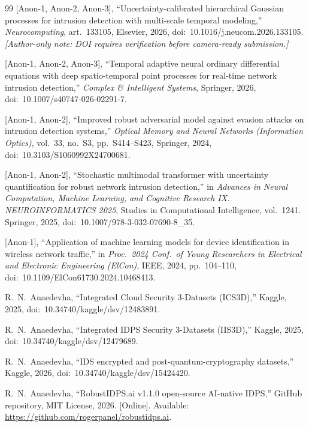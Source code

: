 \documentclass[journal,10pt]{IEEEtran}
\theoremstyle{definition}
\theoremstyle{remark}
\begin{document}
\begin{thebibliography}{99}
 [Anon-1, Anon-2, Anon-3],
``Uncertainty-calibrated hierarchical Gaussian processes for intrusion
detection with multi-scale temporal modeling,''
\emph{Neurocomputing}, art.~133105, Elsevier, 2026,
doi:~10.1016/j.neucom.2026.133105.
\emph{[Author-only note: DOI requires verification before camera-ready submission.]}

 [Anon-1, Anon-2, Anon-3], ``Temporal adaptive
neural ordinary differential equations with deep spatio-temporal point
processes for real-time network intrusion detection,''
\emph{Complex \& Intelligent Systems}, Springer, 2026,
doi:~10.1007/s40747-026-02291-7.

 [Anon-1, Anon-2], ``Improved robust
adversarial model against evasion attacks on intrusion detection
systems,'' \emph{Optical Memory and Neural Networks (Information
Optics)}, vol.~33, no.~S3, pp.~S414--S423, Springer, 2024,
doi:~10.3103/S1060992X24700681.

 [Anon-1, Anon-2], ``Stochastic
multimodal transformer with uncertainty quantification for robust
network intrusion detection,'' in \emph{Advances in Neural Computation,
Machine Learning, and Cognitive Research IX. NEUROINFORMATICS 2025},
Studies in Computational Intelligence, vol.~1241. Springer, 2025,
doi:~10.1007/978-3-032-07690-8\_35.

 [Anon-1], ``Application of machine
learning models for device identification in wireless network
traffic,'' in \emph{Proc.\ 2024 Conf.\ of Young Researchers in
Electrical and Electronic Engineering (ElCon)}, IEEE, 2024,
pp.~104--110, doi:~10.1109/ElCon61730.2024.10468413.

 R.~N.~Anaedevha, ``Integrated Cloud Security
3-Datasets (ICS3D),'' Kaggle, 2025,
doi:~10.34740/kaggle/dsv/12483891.

 R.~N.~Anaedevha, ``Integrated IDPS Security
3-Datasets (IIS3D),'' Kaggle, 2025,
doi:~10.34740/kaggle/dsv/12479689.

 R.~N.~Anaedevha, ``IDS encrypted and
post-quantum-cryptography datasets,'' Kaggle, 2026,
doi:~10.34740/kaggle/dsv/15424420.

 R.~N.~Anaedevha,
``RobustIDPS.ai v1.1.0 open-source AI-native IDPS,''
GitHub repository, MIT License, 2026.
[Online]. Available: \url{https://github.com/rogerpanel/robustidps.ai}.

\end{thebibliography}
\end{document}
